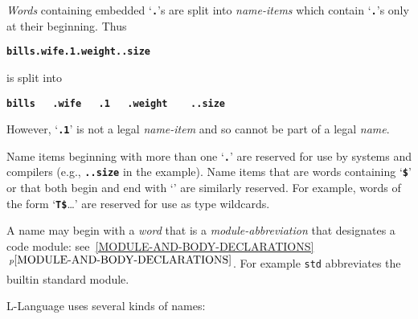 \documentclass[12pt]{article}
\newcommand{\TT}[1]{{\tt \bfseries #1}}
\newcommand{\itemref}[1]{\ref{#1}$\,^{p\pageref{#1}}$}
\begin{document}
{\em Words} containing embedded `\TT{.}'s are split into
{\em name-items} which contain `\TT{.}'s only at their beginning.
Thus
\begin{center}
\TT{bills.wife.1.weight..size}
\end{center}
is split into
\begin{center}
\TT{bills~~~.wife~~~.1~~~.weight~~~~..size}
\end{center}
However, `\TT{.1}' is not a legal {\em name-item} and so cannot
be part of a legal {\em name}.

Name items beginning with more than one `\TT{.}' are reserved
for use by systems and compilers (e.g., \TT{..size} in the example).
Name items that are words containing `\TT{\$}' or that both
begin and end with `\TT{*}' are
similarly reserved.  For example, words of the form `\TT{T\$}\ldots'
are reserved for use as type wildcards.

A name may begin with a {\em word} that is a {\em module-abbreviation}
that designates a code module: see~\itemref{MODULE-AND-BODY-DECLARATIONS}.
For example {\tt std} abbreviates the builtin standard module.

L-Language uses several kinds of names:
\end{document}
